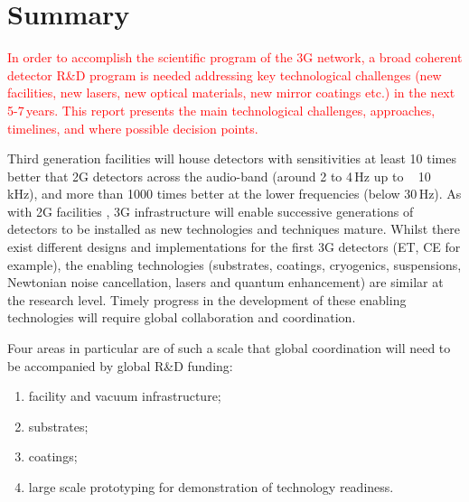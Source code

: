 \chapter{Summary}
\label{sec:Summary}


\textcolor{red} {In order to accomplish the scientific program of the 3G network, a broad coherent detector R\&D program is needed addressing key technological challenges (new facilities, new lasers, new optical materials, new mirror coatings etc.) in the next 5-7\,years. This report presents the main technological challenges, approaches, timelines, and where possible decision points.}


Third generation facilities will house detectors with sensitivities at least 10 times better that 2G detectors across the audio-band (around 2 to 4\,Hz up to  ~ 10\,kHz), and more than 1000 times better at the lower frequencies (below 30\,Hz).    As with 2G facilities , 3G infrastructure will enable successive generations of detectors to be installed as new technologies and techniques mature.  Whilst there exist different designs and implementations for the first 3G detectors (ET, CE for example), the enabling technologies (substrates, coatings, cryogenics, suspensions, Newtonian noise cancellation, lasers and quantum enhancement) are similar at the research level.  Timely progress in the development of these enabling technologies will require global collaboration and coordination.  

Four areas in particular are of such a scale that global coordination will need to be accompanied by global R\&D funding: 

\begin{enumerate}
\item facility and vacuum infrastructure; 
\item  substrates; 
\item coatings; 
\item large scale prototyping for demonstration of technology readiness. 
\end{enumerate}

